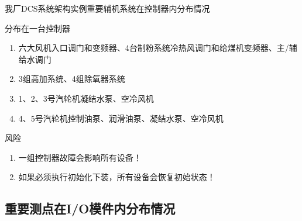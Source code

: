 \documentclass[12pt,hyperref={CJKbookmarks=true}]{beamer} %
\begin{document}
\begin{frame}{我厂DCS系统架构实例}{重要辅机系统在控制器内分布情况}
\begin{exampleblock}{\heiti 分布在一台控制器}
			\begin{enumerate}
				\item  六大风机入口调门和变频器、4台制粉系统冷热风调门和给煤机变频器、主/辅给水调门
				
				\item  3组高加系统、4组除氧器系统
				
				\item   1、2、3号汽轮机凝结水泵、空冷风机

				\item   4、5号汽轮机控制油泵、润滑油泵、凝结水泵、空冷风机
		\end{enumerate}
		\end{exampleblock}
\pause
\begin{alertblock}{\heiti 风险}
			\begin{enumerate}
				\item  一组控制器故障会影响所有设备！
\item  如果必须执行初始化下装，所有设备会恢复初始状态！
		\end{enumerate}
		\end{alertblock}
\end{frame}
\subsection{重要测点在I/O模件内分布情况}
\end{document}
